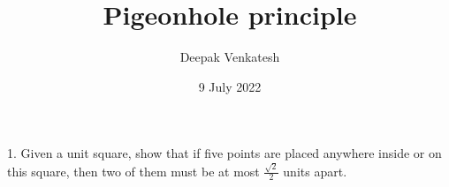 \documentclass[12pt]{article}
\begin{document}
\title{Pigeonhole principle}
\author{Deepak Venkatesh}
\date{9 July 2022}
\maketitle

1. Given a unit square, show that if five points are placed anywhere inside or on this square, then two of them
must be at most $\frac{\sqrt{2}}{2}$ units apart. \newline {}
\end{document}
